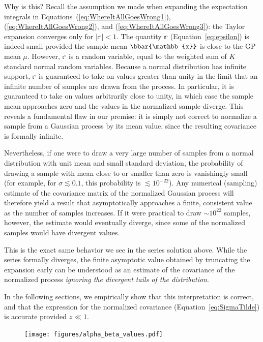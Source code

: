 \documentclass[modern]{aastex62}
\begin{document}
Why is this? Recall the assumption we made when expanding the expectation
integrals in Equations~(\ref{eq:WhereItAllGoesWrong1}), (\ref{eq:WhereItAllGoesWrong2}),
and (\ref{eq:WhereItAllGoesWrong3}): the Taylor expansion converges only for
$\big|\mathbb{r}| < 1$. The quantity $\mathbb{r}$ (Equation~\ref{eq:epsilon})
is indeed small provided the sample mean $\bbar{\mathbb{x}}$ is close to the GP
mean $\mu$. However, $\mathbb{r}$ is a random variable, equal to
the weighted sum of $K$ standard normal random variables. Because a normal
distribution has infinite support, $\mathbb{r}$ is guaranteed to take on
values greater than unity in the limit that an infinite number of samples
are drawn from the process. In particular, it is guaranteed to take on values
arbitrarily close to unity, in which case the sample mean approaches zero and
the values in the normalized sample diverge.
This reveals a fundamental flaw in our premise:
it is simply not correct to normalize a sample from a Gaussian process by its
mean value, since the resulting covariance is formally infinite.

Nevertheless, if one were to draw a very large number of samples from a normal
distribution with unit mean and small standard deviation,
the probability of drawing a sample with mean close to or smaller than zero
is vanishingly small (for example, for $\sigma \lesssim 0.1$, this probability
is $\lesssim 10^{-22}$).
Any numerical (sampling) estimate of the
covariance matrix of the normalized Gaussian process will therefore yield
a result that asymptotically approaches a finite, consistent value as the
number of samples increases. If it were practical to draw
$\sim 10^{22}$ samples, however, the estimate would eventually diverge, since
some of the normalized samples would have divergent values.

This is the exact same behavior we see in the series solution above.
While the series formally diverges, the finite asymptotic value obtained
by truncating the expansion early can be understood as an estimate of
the covariance of the normalized process \emph{ignoring the divergent
    tails of the distribution}.

In the following sections, we empirically show that this interpretation is
correct, and that the expression for the normalized covariance
(Equation~\ref{eq:SigmaTilde}) is accurate provided $z \ll 1$.

%
\begin{figure}[t!]
    \begin{centering}
        \texttt{[image: figures/alpha\_beta\_values.pdf]}
    \end{centering}
\end{figure}
%
\end{document}

